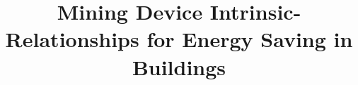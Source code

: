 \documentclass{sig-alternate-ipsn13}
\title{Mining Device Intrinsic-Relationships for Energy Saving in Buildings}
\begin{document}
\maketitle



















\small


\end{document}

